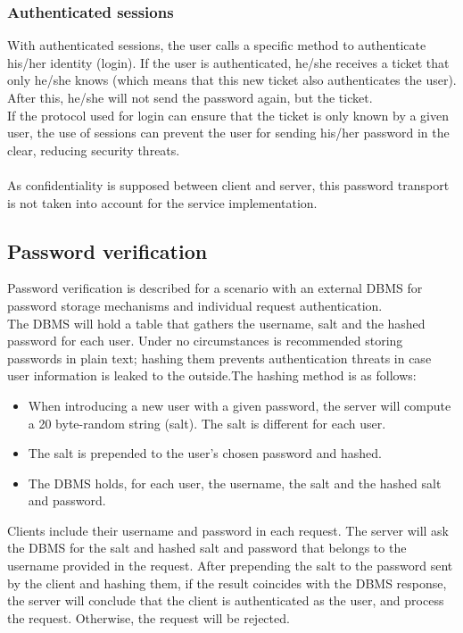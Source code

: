 \subsubsection*{Authenticated sessions}\label{pwdtrans2}
With authenticated sessions, the user calls a specific method to authenticate his/her identity (login). If the user is authenticated, he/she receives a ticket that only he/she knows (which means that this new ticket also authenticates the user). After this, he/she will not send the password again, but the ticket.\\
If the protocol used for login can ensure that the ticket is only known by a given user, the use of sessions can prevent the user for sending his/her password in the clear, reducing security threats.\\\\
As confidentiality is supposed between client and server, this password transport is not taken into account for the service implementation.
\subsection{Password verification}\label{subsec:pwdverif}
Password verification is described for a scenario with an external DBMS for password storage mechanisms and individual request authentication.\\
The DBMS will hold a table that gathers the username, salt and the hashed password for each user. Under no circumstances is recommended storing passwords in plain text; hashing them prevents authentication threats in case user information is leaked to the outside.The hashing method is as follows:
\begin{itemize}
	\item When introducing a new user with a given password, the server will compute a 20 byte-random string (salt). The salt is different for each user.
	\item The salt is prepended to the user's chosen password and hashed.
	\item The DBMS holds, for each user, the username, the salt and the hashed salt and password.
\end{itemize}
Clients include their username and password in each request. The server will ask the DBMS for the salt and hashed salt and password that belongs to the username provided in the request. After prepending the salt to the password sent by the client and hashing them, if the result coincides with the DBMS response, the server will conclude that the client is authenticated as the user, and process the request. Otherwise, the request will be rejected.